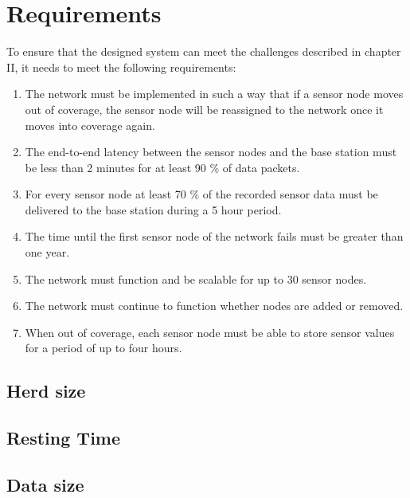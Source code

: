 \documentclass[conference]{IEEEtran}
\begin{document}
\section{Requirements}

To ensure that the designed system can meet the challenges described in chapter II, it
needs to meet the following requirements:

\begin{enumerate} 

    \item The network must be implemented in such a way that if a sensor node
        moves out of coverage, the sensor node will be reassigned to the
        network once it moves into coverage again.  
        
    \item The end-to-end latency between the sensor nodes and the base station
        must be less than 2 minutes for at least 90 \% of data packets.
        
    \item For every sensor node at least 70 \% of the recorded sensor data must
        be delivered to the base station during a 5 hour period.
        
    \item The time until the first sensor node of the network fails must be
        greater than one year.  
        
    \item The network must function and be scalable for up to 30 sensor nodes.
        
    \item The network must continue to function whether nodes are added or
        removed.
    
    \item When out of coverage, each sensor node must be able to store sensor
        values for a period of up to four hours.

\end{enumerate}

\subsection{Herd size}

\subsection{Resting Time}

\subsection{Data size}
\end{document}
